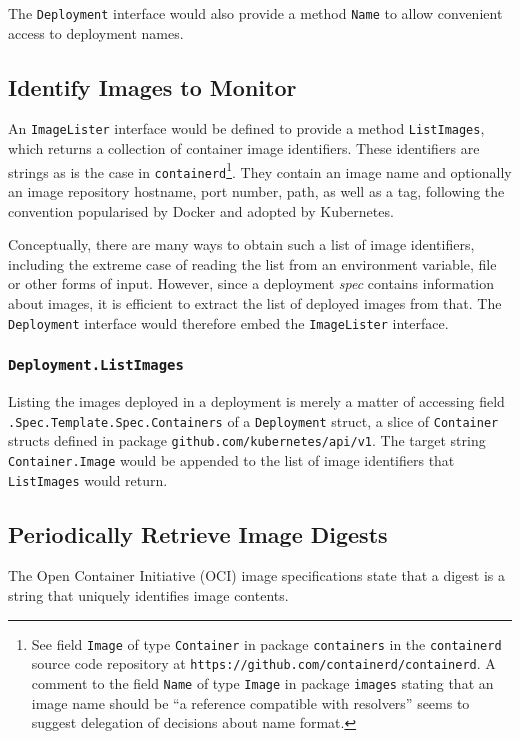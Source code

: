 \documentclass{article}
\begin{document}
The \texttt{Deployment} interface would also provide a method \texttt{Name}
to allow convenient access to deployment names.

\subsection{Identify Images to Monitor}
An \texttt{ImageLister} interface would be defined
to provide a method \texttt{ListImages},
which returns a collection of container image identifiers.
These identifiers are strings as is the case in \texttt{containerd}\footnote{
    See field \texttt{Image} of type \texttt{Container}
    in package \texttt{containers} in
    the \texttt{containerd} source code repository
    at \texttt{https://github.com/containerd/containerd}.
    A comment to the field \texttt{Name} of type \texttt{Image}
    in package \texttt{images}
    stating that an image name should be
    ``a reference compatible with resolvers''
    seems to suggest delegation of decisions about name format.
}.
They contain an image name and
optionally an image repository hostname, port number, path, as well as a tag,
following the convention popularised by Docker and adopted by Kubernetes.

Conceptually, there are many ways to obtain such a list of image identifiers,
including the extreme case of reading the list from an environment variable,
file or other forms of input.
However, since a deployment \textit{spec} contains information about images,
it is efficient to extract the list of deployed images from that.
The \texttt{Deployment} interface would therefore
embed the \texttt{ImageLister} interface.

\subsubsection{\texttt{Deployment.ListImages}}
Listing the images deployed in a deployment is merely
a matter of accessing field \texttt{.Spec.Template.Spec.Containers}
of a \texttt{Deployment} struct,
a slice of \texttt{Container} structs
defined in package \texttt{github.com/kubernetes/api/v1}.
The target string \texttt{Container.Image} would be appended
to the list of image identifiers that \texttt{ListImages} would return.

\subsection{Periodically Retrieve Image Digests}
The Open Container Initiative (OCI) image specifications state that
a digest is a string that uniquely identifies image contents.
\end{document}
